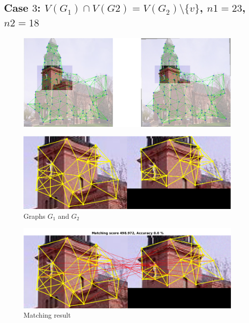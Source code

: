\documentclass[
	fontsize=12pt,
	paper=a4,
	twoside=false,
	numbers=noenddot,
	plainheadsepline,
	toc=listof,
	toc=bibliography
]{scrartcl}
\begin{document}
\subsection*{ Case $3$: $V(G_1)\cap V(G2) = V(G_2)\setminus\{v\}$, $n1=23$, $n2=18$}
\begin{figure} [htb] \centering
	\includegraphics[scale = 0.35]{test3/subregions.png}
\end{figure}
\begin{figure} [hb] \centering
	\includegraphics[scale = 0.4]{test3/subgraphs.png}
	\caption{Graphs $G_1$ and $G_2$}
\end{figure}
\begin{figure} [htb] \centering
	\includegraphics[scale = 0.4]{test3/matching_result.png}
	\caption{ Matching result}
\end{figure}

\FloatBarrier

\newpage
\end{document}
